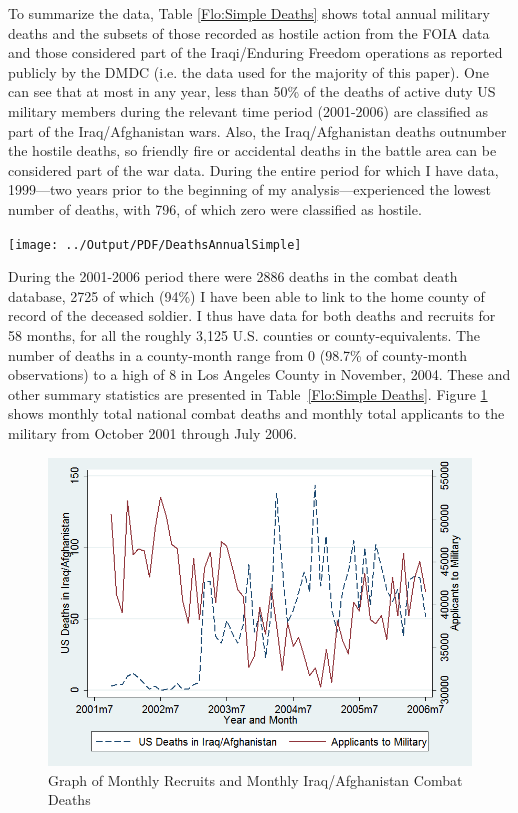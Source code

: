 \documentclass[12pt] {article}
\begin{document}
To summarize the data, Table \ref{Flo:Simple Deaths} shows total annual military deaths and the subsets of those recorded as hostile action from the FOIA data and those considered part of the Iraqi/Enduring Freedom operations as reported publicly by the DMDC (i.e. the data used for the majority of this paper). One can see that at most in any year, less than 50\% of the deaths of active duty US military members during the relevant time period (2001-2006) are classified as part of the Iraq/Afghanistan wars. Also, the Iraq/Afghanistan deaths outnumber the hostile deaths, so friendly fire or accidental deaths in the battle area can be considered part of the war data. During the entire period for which I have data, 1999---two years prior to the beginning of my analysis---experienced the lowest number of deaths, with 796, of which zero were classified as hostile. 

\begin{table}
\caption{}
\label{Flo:Simple Deaths}\texttt{[image: ../Output/PDF/DeathsAnnualSimple]}
\end{table}


During the 2001-2006 period there were 2886 deaths in the combat death database, 2725 of which (94\%) I have been able to link to the home county of record of the deceased soldier. I thus have data for both deaths and recruits for 58 months, for all the roughly 3,125 U.S. counties or county-equivalents. The number of deaths in a county-month range from 0 (98.7\% of county-month observations) to a high of 8 in Los Angeles County in November, 2004. These and other summary statistics are presented in Table~\ref{Flo:Simple Deaths}. Figure \ref{Flo:Monthly Deaths vs. Monthly Recruits} shows monthly total national combat deaths and monthly total applicants to the military from October 2001 through July 2006. 

\begin{figure}
\includegraphics[scale=0.6]{../Output/graph_deathsvsrecruits_basic}
\caption{Graph of Monthly Recruits and Monthly Iraq/Afghanistan Combat Deaths}
\label{Flo:Monthly Deaths vs. Monthly Recruits}
\end{figure} 
 
\end{document}
